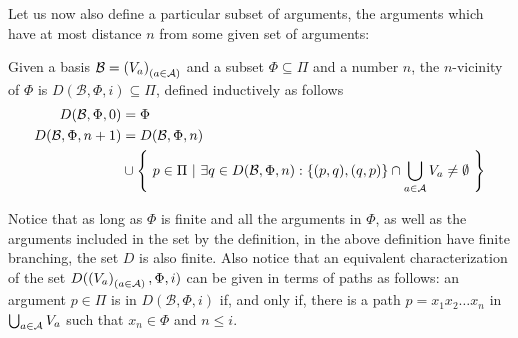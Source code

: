 \documentclass{llncs}
\newcommand{\carriers}[1]{Q_{#1}}
\newcommand{\kmod}[2]{{\cal K}_{(#1,#2)}}
\newcommand{\rels}[1]{{\sf R_{#1}}}
\newcommand{\basis}{basis }
\newcommand{\views}{\mathcal B}
\newcommand{\viewsv}{\left(V_a\right)_{(a \in \agents)}}
\newcommand{\sem}{\varepsilon}
\newcommand{\bisim}{\underline{\leftrightarrow}}
\begin{document}

Let us now also define a particular subset of arguments, the arguments which have at most distance $n$ from some given set of arguments: 

\begin{definition}\label{def:vicinity}Given a \basis $\views = \viewsv$ and a subset $\Phi \subseteq \Pi$ and a number $n$, the $n$-vicinity of $\Phi$ is $D(\views, \Phi, i) \subseteq \Pi$, defined inductively as follows
\begin{align*}
D(\views, \Phi, 0) &= \Phi \\
D(\views, \Phi, n+1) &= D(\views, \Phi, n) \\ 
&\cup \left\{~p \in \Pi ~|~ \exists q \in D(\views, \Phi, n): \{(p,q),(q,p)\} \cap \bigcup_{a \in \agents}V_a \not = \emptyset ~\right\}\\
\end{align*}
\end{definition}

Notice that as long as $\Phi$ is finite and all the arguments in $\Phi$, as well as the arguments included in the set by the definition, in the above definition have finite branching, the set $D$ is also finite. Also notice that an equivalent characterization of the set $D(\viewsv,\Phi,i)$ can be given in terms of paths as follows: an argument $p \in \Pi$ is in $D(\views,\Phi,i)$ if, and only if, there is a path $p=x_1x_2\ldots x_n$ in $\bigcup_{a \in \mathcal A}V_a$ such that $x_n \in \Phi$ and $n \leq i$. 
\end{document}
